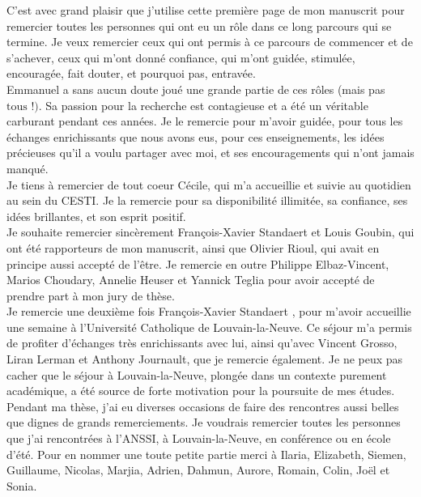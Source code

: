 C'est avec grand plaisir que j'utilise cette premi\`ere page de mon manuscrit pour remercier toutes les personnes qui ont eu un r\^{o}le dans ce long parcours qui se termine. Je veux remercier ceux qui ont permis \`a ce parcours de commencer et de s'achever, ceux qui m'ont donn\'e confiance, qui m'ont guid\'ee, stimul\'ee, encourag\'ee, fait douter, et pourquoi pas, entrav\'ee. \\

Emmanuel a sans aucun doute jou\'e une grande partie de ces r\^{o}les (mais pas $\text{tous !)}$. Sa passion pour la recherche est contagieuse et a \'et\'e un v\'eritable carburant pendant ces ann\'ees. Je le remercie pour m'avoir guid\'ee, pour tous les \'echanges enrichissants que nous avons eus, pour ces enseignements, les id\'ees pr\'ecieuses qu'il a voulu partager avec moi, et ses encouragements qui n'ont jamais manqu\'e. \\

Je tiens \`a remercier de tout coeur C\'ecile, qui m'a accueillie et suivie au quotidien au sein du CESTI. Je la remercie pour sa disponibilit\'e illimit\'ee, sa confiance, ses id\'ees brillantes, et son esprit positif. \\

Je souhaite remercier sinc\`{e}rement Fran\c{c}ois-Xavier Standaert et Louis Goubin, qui ont \'et\'e rapporteurs de mon manuscrit, ainsi que Olivier Rioul, qui avait en principe aussi accept\'e de l'\^{e}tre. Je remercie en outre Philippe Elbaz-Vincent, Marios Choudary,  Annelie Heuser et Yannick Teglia  pour avoir accept\'e de prendre part \`a mon jury de th\`{e}se. \\

Je remercie une deuxi\`{e}me fois Fran\c{c}ois-Xavier Standaert , pour m'avoir accueillie une semaine \`a l'Universit\'e Catholique de Louvain-la-Neuve. Ce s\'ejour m'a permis de profiter d'\'echanges tr\`{e}s enrichissants avec lui, ainsi qu'avec Vincent Grosso, Liran Lerman et Anthony Journault, que je remercie \'egalement. Je ne peux pas cacher que le s\'ejour \`a Louvain-la-Neuve, plong\'ee dans un contexte purement acad\'emique, a \'et\'e source de forte motivation pour la poursuite de mes \'etudes. \\

Pendant ma th\`{e}se, j'ai eu diverses occasions de faire des rencontres aussi belles que dignes de grands remerciements. Je voudrais remercier toutes les personnes que j'ai rencontr\'ees \`a l'ANSSI, \`a Louvain-la-Neuve, en conf\'erence ou en \'ecole d'\'et\'e. Pour en nommer une toute petite partie merci \`a Ilaria, Elizabeth, Siemen, Guillaume, Nicolas, Marjia, Adrien, Dahmun, Aurore, Romain, Colin, Jo\"el et Sonia.\\

